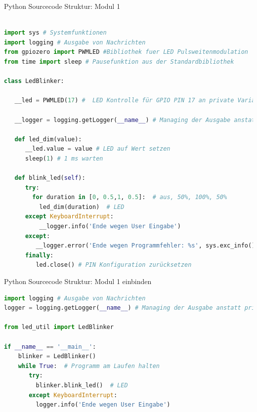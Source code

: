 \begin{frame}[fragile]{Python Sourcecode Struktur: Modul 1}
\begin{lstlisting}[language=Python]

import sys # Systemfunktionen
import logging # Ausgabe von Nachrichten
from gpiozero import PWMLED #Bibliothek fuer LED Pulsweitenmodulation
from time import sleep # Pausefunktion aus der Standardbibliothek

class LedBlinker:
	 
   __led = PWMLED(17) #  LED Kontrolle für GPIO PIN 17 an private Variable zuweisen
   
   __logger = logging.getLogger(__name__) # Managing der Ausgabe anstatt print() Funktion
   
   def led_dim(value):
      __led.value = value # LED auf Wert setzen
      sleep(1) # 1 ms warten
   
   def blink_led(self):
      try:
        for duration in [0, 0.5,1, 0.5]:  # aus, 50%, 100%, 50%
          led_dim(duration)  # LED     
      except KeyboardInterrupt:  
          __logger.info('Ende wegen User Eingabe')
      except:  
         __logger.error('Ende wegen Programmfehler: %s', sys.exc_info()[0]) # siehe https://docs.python.org/3/tutorial/errors.html
      finally:  
         led.close() # PIN Konfiguration zurücksetzen

\end{lstlisting}
\end{frame}


\begin{frame}[fragile]{Python Sourcecode Struktur: Modul 1 einbinden}
\begin{lstlisting}[language=Python]
import logging # Ausgabe von Nachrichten
logger = logging.getLogger(__name__) # Managing der Ausgabe anstatt print() Funktion

from led_util import LedBlinker

if __name__ == '__main__':
    blinker = LedBlinker()
    while True:  # Programm am Laufen halten
       try:
         blinker.blink_led()  # LED 
       except KeyboardInterrupt:  
         logger.info('Ende wegen User Eingabe')

\end{lstlisting}
\end{frame}


